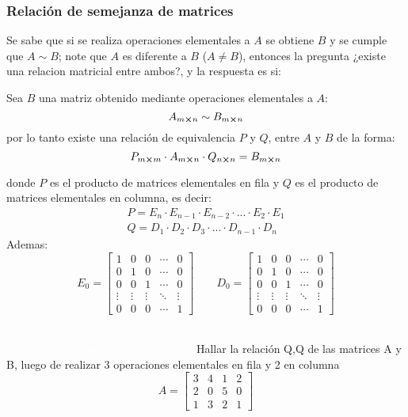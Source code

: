 \subsubsection{Relación de semejanza de matrices}
Se sabe que si se realiza operaciones elementales a $A$ se obtiene $B$ y se cumple que $A\sim B$; note que $A$ es diferente a $B$ ($A\ne B$), entonces la pregunta ¿existe una relacion matricial entre ambos?, y la respuesta es si:
\begin{Theorem*} {}
	Sea $B$ una matriz obtenido mediante operaciones elementales a $A$:
	$$A_{m\cross n}\sim B_{m\cross n}$$
	por lo tanto existe una relación de equivalencia $P$ y $Q$, entre $A$ y $B$ de la forma:
	$$ P_{m\cross m}\cdot A_{m\cross n}\cdot Q_{n\cross n}=B_{m\cross n} $$
\end{Theorem*}
donde $P$ es el producto de matrices elementales en fila y $Q$ es el producto de matrices elementales en columna, es decir: \\
\begin{gather*}
	P=E_n\cdot E_{n-1}\cdot E_{n-2}\cdot...\cdot E_2\cdot E_1\\
	Q=D_1\cdot D_2\cdot D_3\cdot...\cdot D_{n-1}\cdot D_n
\end{gather*}
Ademas:
$$
	E_0=\left[\begin{smallmatrix}
		1&0&0&\cdots&0\\
		0&1&0&\cdots&0\\
		0&0&1&\cdots&0\\
		\vdots&\vdots&\vdots&\ddots&\vdots\\
		0&0&0&\cdots&1
	\end{smallmatrix}\right] \quad\quad D_0=\left[\begin{smallmatrix}
		1&0&0&\cdots&0\\
		0&1&0&\cdots&0\\
		0&0&1&\cdots&0\\
		\vdots&\vdots&\vdots&\ddots&\vdots\\
		0&0&0&\cdots&1
	\end{smallmatrix}\right]
$$\\
\addtocounter{exr}{1} 
\colorbox{gray!55}{\textcolor{white}{Ej.) relación de semejanza de matrices}}
	Hallar la relación Q,Q de las matrices A y B, luego de realizar 3 operaciones elementales en fila y 2 en columna
	$$ A=\begin{bmatrix}
		3&4&1&2\\
		2&0&5&0\\
		1&3&2&1
	\end{bmatrix} $$ \\
